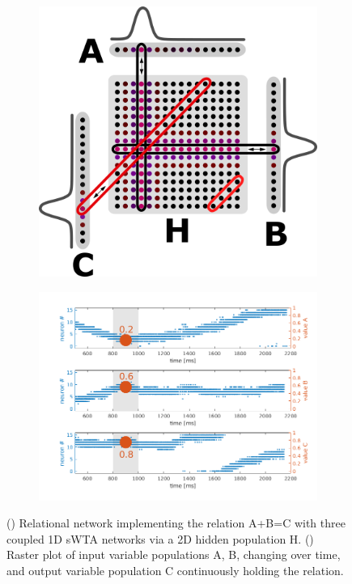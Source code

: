 \begin{figure}[b!]
  \centering
  \begin{subfigure}{.38\textwidth}
    \includegraphics[width=\linewidth]{img/chapter5/threeway_hardwired.png}
    \caption{}
    \label{fig:rel_net_arch}
  \end{subfigure}
  \hfill
  \begin{subfigure}{.49\textwidth}
    \includegraphics[width=\linewidth]{img/chapter5/threeway_raster.png}
    \caption{}
    \label{fig:rel_net_rast}
  \end{subfigure}
    \caption[Relational network example.]{() Relational network implementing the relation A+B=C with three coupled 1D \ac{sWTA} networks via a 2D hidden population H. () Raster plot of input variable populations A, B, changing over time, and output variable population C continuously holding the relation.}
  \label{fig:rel_net}
\end{figure}

